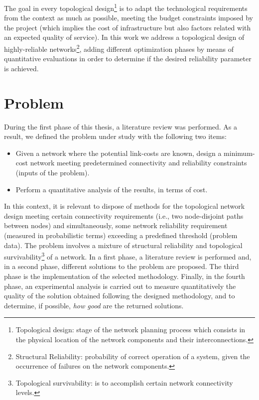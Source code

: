 The goal in every topological design\footnote{Topological design: stage of the network planning process  which consists in the physical location of the network components and their interconnections.} is to adapt the technological requirements from the context as much as possible, meeting the budget constraints 
imposed by the project (which implies the cost of infrastructure but also factors related with an expected quality of service). In this work we address a topological design of highly-reliable networks\footnote{Structural Reliability: probability of correct operation of a system, given the occurrence of failures on the network components.}, adding different optimization phases by means of quantitative evaluations in order to determine if the desired reliability parameter is achieved.

\section{Problem}
During the first phase of this thesis, a literature review was performed. As a result, we defined the problem under study with the following two items:
\begin{itemize}
    \item Given a network where the potential link-costs are known, design a minimum-cost network meeting predetermined connectivity and reliability constraints (inputs of the problem).
    \item Perform a quantitative analysis of the results, in terms of cost.
\end{itemize}
In this context, it is relevant to dispose of methods for the topological network design meeting certain 
connectivity requirements (i.e., two node-disjoint paths between nodes) and simultaneously, some 
network reliability requirement (measured in probabilistic terms) exceeding a predefined threshold (problem data). The problem involves a mixture of structural reliability and topological survivability\footnote{Topological survivability: is to accomplish certain network connectivity levels.} of a network. 
In a first phase, a literature review is performed and, in a second phase, different solutions to the problem are proposed. The third phase is the implementation of the selected methodology. Finally, in the fourth phase, 
an experimental analysis is carried out to measure quantitatively the quality of the solution obtained following the designed methodology, and to determine, if possible, \emph{how good} are the returned solutions.  

